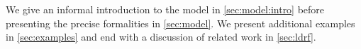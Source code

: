 We give an informal introduction to the model in \textsection\ref{sec:model:intro} before presenting the precise formalities in \textsection\ref{sec:model}.
We present additional examples in \textsection\ref{sec:examples} and end with
a discussion of related work in \textsection\ref{sec:ldrf}.



